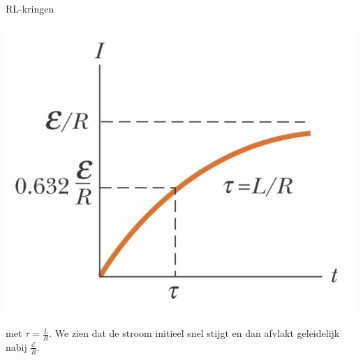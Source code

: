 \begin{app}[RL-kringen]{RL-kringen}
\begin{minipage}{.3\textwidth}
        \includegraphics[scale = 0.35]{Images/Magnetisme/RLKringGraph.png}
    \end{minipage}

    \noindent met $\tau = \tfrac{L}{R}$. We zien dat de stroom initieel snel stijgt en dan afvlakt geleidelijk nabij $\tfrac{\mathcal{E}}{R}$.
\end{app}

